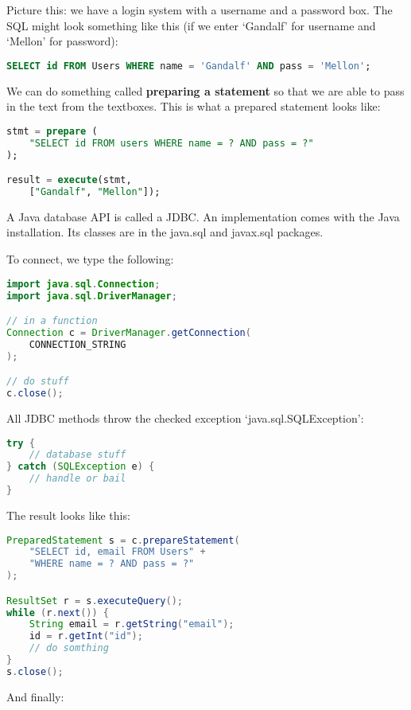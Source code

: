 \documentclass[11pt,a4paper,titlepage,dvipsnames,cmyk]{scrartcl}
\begin{document}
Picture this: we have a login system with a username and a password box.
The SQL might look something like this (if we enter `Gandalf' for username
and `Mellon' for password):

\begin{lstlisting}[language=SQL]
SELECT id FROM Users WHERE name = 'Gandalf' AND pass = 'Mellon';
\end{lstlisting}

We can do something called \textbf{preparing a statement} so that we are
able to pass in the text from the textboxes. This is what a prepared
statement looks like:

\begin{lstlisting}[language=SQL]
stmt = prepare (
    "SELECT id FROM users WHERE name = ? AND pass = ?"
);

result = execute(stmt,
    ["Gandalf", "Mellon"]);
\end{lstlisting}

A Java database API is called a JDBC. An implementation comes with the
Java installation. Its classes are in the java.sql and javax.sql packages.

To connect, we type the following:

\begin{lstlisting}[language=Java]
import java.sql.Connection;
import java.sql.DriverManager;

// in a function
Connection c = DriverManager.getConnection(
    CONNECTION_STRING
);

// do stuff
c.close();
\end{lstlisting}

All JDBC methods throw the checked exception `java.sql.SQLException':

\begin{lstlisting}[language=Java]
try {
    // database stuff
} catch (SQLException e) {
    // handle or bail
}
\end{lstlisting}

The result looks like this:

\begin{lstlisting}[language=Java]
PreparedStatement s = c.prepareStatement(
    "SELECT id, email FROM Users" + 
    "WHERE name = ? AND pass = ?"
);

ResultSet r = s.executeQuery();
while (r.next()) {
    String email = r.getString("email");
    id = r.getInt("id");
    // do somthing
}
s.close();
\end{lstlisting}

And finally:
\end{document}

